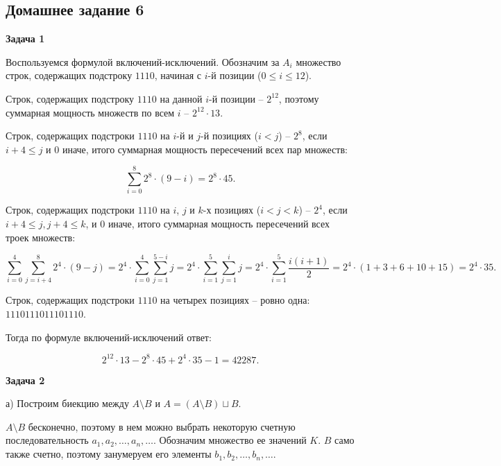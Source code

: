 \subsection{Домашнее задание 6}


	\begin{center}
    \textbf{Задача 1}
\end{center}
		Воспользуемся формулой включений-исключений. Обозначим за $A_i$ множество строк, содержащих подстроку $1110$, начиная с $i$-й позиции ($0 \le i \le 12$).

		Строк, содержащих подстроку $1110$ на данной $i$-й позиции -- $2^{12}$, поэтому суммарная мощность множеств по всем $i$ -- $2^{12} \cdot 13$.

		Строк, содержащих подстроки $1110$ на $i$-й и $j$-й позициях ($i < j$) -- $2^8$, если $i + 4 \le j$ и $0$ иначе, итого суммарная мощность пересечений всех пар множеств:

		\begin{equation*}
			\sum_{i=0}^8 2^8 \cdot (9-i) = 2^8 \cdot 45.
		\end{equation*}

		Строк, содержащих подстроки $1110$ на $i$, $j$ и $k$-х позициях ($i < j < k$) -- $2^4$, если $i + 4 \le j, j + 4 \le k$, и $0$ иначе, итого суммарная мощность пересечений всех троек множеств:

		\begin{equation*}
			\sum_{i=0}^4 \sum_{j=i+4}^8 2^4 \cdot (9-j) = 2^4 \cdot \sum_{i=0}^4 \sum_{j=1}^{5-i} j = 2^4 \cdot \sum_{i=1}^5 \sum_{j=1}^i j = 2^4 \cdot \sum_{i=1}^5 \frac{i(i+1)}{2} = 2^4 \cdot (1 + 3 + 6 + 10 + 15) = 2^4 \cdot 35.
		\end{equation*}

		Строк, содержащих подстроки $1110$ на четырех позициях -- ровно одна: $1110111011101110$.

		Тогда по формуле включений-исключений ответ:

		\begin{equation*}
			2^{12} \cdot 13 - 2^8 \cdot 45 + 2^4 \cdot 35 - 1 = 42287.
		\end{equation*}


	\begin{center}
    \textbf{Задача 2}
\end{center}
		а) Построим биекцию между $A \setminus B$ и $A = (A \setminus B) \sqcup B$.

		$A \setminus B$ бесконечно, поэтому в нем можно выбрать некоторую счетную последовательность $a_1, a_2, \dots, a_n, \dots$. Обозначим множество ее значений $K$. $B$ само также счетно, поэтому занумеруем его элементы $b_1, b_2, \dots, b_n, \dots$.

